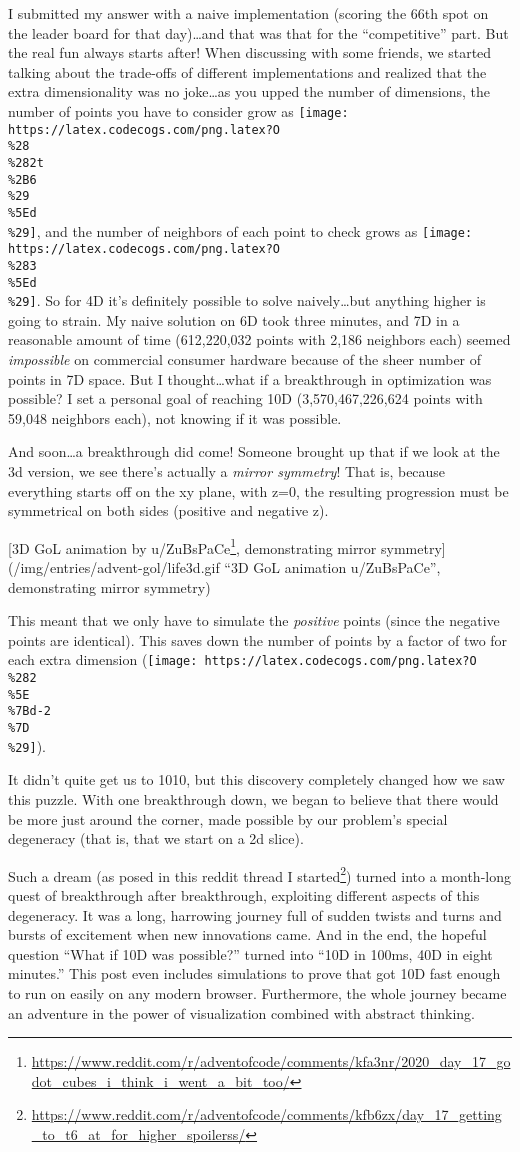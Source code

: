 \documentclass[]{article}
\renewcommand{\href}[2]{#2\footnote{\url{#1}}}
\begin{document}
I submitted my answer with a naive implementation (scoring the 66th spot on the
leader board for that day)\ldots and that was that for the ``competitive'' part.
But the real fun always starts after! When discussing with some friends, we
started talking about the trade-offs of different implementations and realized
that the extra dimensionality was no joke\ldots as you upped the number of
dimensions, the number of points you have to consider grow as
\texttt{[image: https://latex.codecogs.com/png.latex?O\\\%28\\\%282t\\\%2B6\\\%29\\\%5Ed\\\%29]},
and the number of neighbors of each point to check grows as
\texttt{[image: https://latex.codecogs.com/png.latex?O\\\%283\\\%5Ed\\\%29]}. So for
4D it's definitely possible to solve naively\ldots but anything higher is going
to strain. My naive solution on 6D took three minutes, and 7D in a reasonable
amount of time (612,220,032 points with 2,186 neighbors each) seemed
\emph{impossible} on commercial consumer hardware because of the sheer number of
points in 7D space. But I thought\ldots what if a breakthrough in optimization
was possible? I set a personal goal of reaching 10D (3,570,467,226,624 points
with 59,048 neighbors each), not knowing if it was possible.

And soon\ldots a breakthrough did come! Someone brought up that if we look at
the 3d version, we see there's actually a \emph{mirror symmetry}! That is,
because everything starts off on the xy plane, with z=0, the resulting
progression must be symmetrical on both sides (positive and negative z).

{[}3D GoL animation by
\href{https://www.reddit.com/r/adventofcode/comments/kfa3nr/2020_day_17_godot_cubes_i_think_i_went_a_bit_too/}{u/ZuBsPaCe},
demonstrating mirror symmetry{]}(/img/entries/advent-gol/life3d.gif ``3D GoL
animation u/ZuBsPaCe'', demonstrating mirror symmetry)

This meant that we only have to simulate the \emph{positive} points (since the
negative points are identical). This saves down the number of points by a factor
of two for each extra dimension
(\texttt{[image: https://latex.codecogs.com/png.latex?O\\\%282\\\%5E\\\%7Bd-2\\\%7D\\\%29]}).

It didn't quite get us to 1010, but this discovery completely changed how we saw
this puzzle. With one breakthrough down, we began to believe that there would be
more just around the corner, made possible by our problem's special degeneracy
(that is, that we start on a 2d slice).

Such a dream (as posed in
\href{https://www.reddit.com/r/adventofcode/comments/kfb6zx/day_17_getting_to_t6_at_for_higher_spoilerss/}{this
reddit thread I started}) turned into a month-long quest of breakthrough after
breakthrough, exploiting different aspects of this degeneracy. It was a long,
harrowing journey full of sudden twists and turns and bursts of excitement when
new innovations came. And in the end, the hopeful question ``What if 10D was
possible?'' turned into ``10D in 100ms, 40D in eight minutes.'' This post even
includes simulations to prove that got 10D fast enough to run on easily on any
modern browser. Furthermore, the whole journey became an adventure in the power
of visualization combined with abstract thinking.
\end{document}
